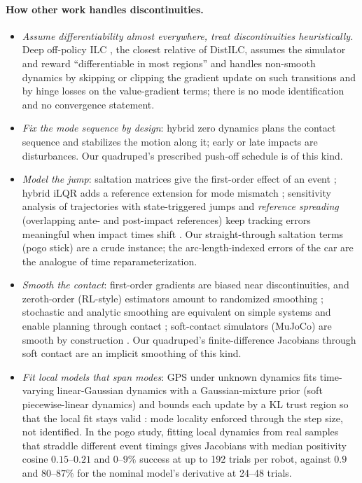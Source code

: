 \documentclass[11pt]{article}
\theoremstyle{definition}
\theoremstyle{remark}
\begin{document}
\paragraph{How other work handles discontinuities.}
\begin{itemize}[leftmargin=1.5em]
\item \emph{Assume differentiability almost everywhere, treat discontinuities heuristically.} Deep off-policy ILC
  \cite{gurumurthy2023deepilc}, the closest relative of DistILC, assumes the simulator and reward ``differentiable in
  most regions'' and handles non-smooth dynamics by skipping or clipping the gradient update on such transitions and by
  hinge losses on the value-gradient terms; there is no mode identification and no convergence statement.
\item \emph{Fix the mode sequence by design}: hybrid zero dynamics \cite{westervelt2007feedback} plans the contact
  sequence and stabilizes the motion along it; early or late impacts are disturbances. Our quadruped's prescribed
  push-off schedule is of this kind.
\item \emph{Model the jump}: saltation matrices give the first-order effect of an event
  \cite{burden2016pwd,kong2021hilqr}; hybrid iLQR adds a reference extension for mode mismatch \cite{kong2021hilqr};
  sensitivity analysis of trajectories with state-triggered jumps and \emph{reference spreading} (overlapping ante- and
  post-impact references) keep tracking errors meaningful when impact times shift
  \cite{saccon2014sensitivity,rijnen2020reference}. Our straight-through saltation terms (pogo stick) are a crude
  instance; the arc-length-indexed errors of the car are the analogue of time reparameterization.
\item \emph{Smooth the contact}: first-order gradients are biased near discontinuities, and zeroth-order (RL-style)
  estimators amount to randomized smoothing \cite{suh2022pg}; stochastic and analytic smoothing are equivalent on simple
  systems and enable planning through contact \cite{pang2023global}; soft-contact simulators (MuJoCo) are smooth by
  construction \cite{todorov2014convex}. Our quadruped's finite-difference Jacobians through soft contact are an implicit
  smoothing of this kind.
\item \emph{Fit local models that span modes}: GPS under unknown dynamics fits time-varying linear-Gaussian dynamics
  with a Gaussian-mixture prior (soft piecewise-linear dynamics) and bounds each update by a KL trust region so that the
  local fit stays valid \cite{levine2014unknown}: mode locality enforced through the step size, not identified. In the
  pogo study, fitting local dynamics from real samples that straddle different event timings gives Jacobians with median
  positivity cosine $0.15$--$0.21$ and $0$--$9\%$ success at up to 192 trials per robot, against $0.9$ and $80$--$87\%$ for the
  nominal model's derivative at 24--48 trials.
\end{itemize}
\end{document}
